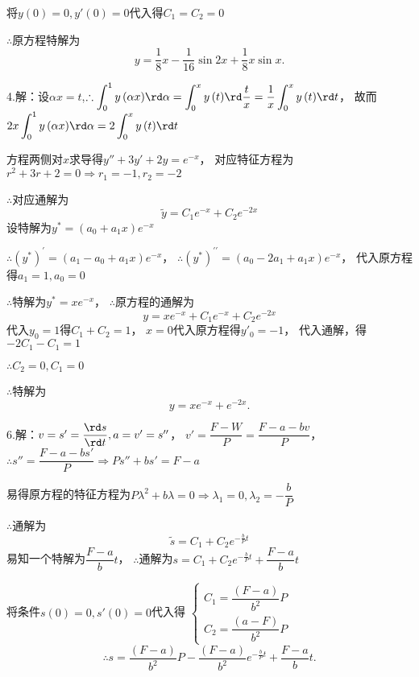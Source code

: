   将$y\left( 0 \right) = 0,y'\left( 0 \right) = 0$代入得${C_1} = {C_2} = 0$

  $\therefore $原方程特解为
  \[y = \dfrac{1}{8}x - \dfrac{1}{{16}}\sin 2x + \dfrac{1}{8}x\sin x.\]

  4.解：设$\alpha x = t$,$\therefore \displaystyle\int_0^1 {y\left( {\alpha x} \right)} \rd \alpha  = \int_0^x {y\left( t \right)}\rd \dfrac{t}{x} = \dfrac{1}{x}\int_0^x {y\left( t \right)} \rd t $，
  故而$2x\displaystyle\int_0^1 {y\left( {\alpha x} \right)} \rd \alpha  = 2\int_0^x {y\left( t \right)} \rd t$

  方程两侧对$x$求导得$y'' + 3y' + 2y = {e^{ - x}}$，
  对应特征方程为${r^2} + 3r + 2 = 0 \Rightarrow {r_1} =  - 1,{r_2} =  - 2$

  $\therefore $对应通解为\[\tilde y = {C_1}{e^{ - x}} + {C_2}{e^{ - 2x}}\]
  设特解为${y^*} = \left( {{a_0} + {a_1}x} \right){e^{ - x}}$

  $\therefore {\left( {{y^*}} \right)^\prime } = \left( {{a_1} - {a_0} + {a_1}x} \right){e^{ - x}}$，
  $\therefore {\left( {{y^*}} \right)^{\prime \prime }} = \left( {{a_0} - 2{a_1} + {a_1}x} \right){e^{ - x}}$，
  代入原方程得${a_1} = 1,{a_0} = 0$

  $\therefore $特解为${y^*} = x{e^{ - x}}$，
  $\therefore $原方程的通解为\[y = x{e^{ - x}} + {C_1}{e^{ - x}} + {C_2}{e^{ - 2x}}\]
  代入${y_0} = 1$得${C_1} + {C_2} = 1$，
  $x = 0$代入原方程得${y'_0}= - 1$，
  代入通解，得$ - 2{C_1} - {C_1} = 1$

  $\therefore {C_2} = 0 , {C_1} = 0$

  $\therefore $特解为\[y = x{e^{ - x}} + {e^{ - 2x}}.\]

  6.解：$v = s' = \dfrac{{\rd s}}{{\rd t}}, a = v' = s''$，
  $v' = \dfrac{{F - W}}{P} = \dfrac{{F - a - bv}}{P}$，
  $\therefore s'' = \dfrac{{F - a - bs'}}{P} \Rightarrow Ps'' + bs' = F - a$

  易得原方程的特征方程为$P{\lambda ^2} + b\lambda  = 0 \Rightarrow {\lambda _1} = 0,{\lambda _2} =  - \dfrac{b}{P}$

  $\therefore $通解为\[\tilde s = {C_1} + {C_2}{e^{ - \frac{b}{P}t}}\]
  易知一个特解为$\dfrac{{F - a}}{b}t$，
  $\therefore $通解为$s = {C_1} + {C_2}{e^{ - \frac{b}{P}t}} + \dfrac{{F - a}}{b}t$

  将条件$s\left( 0 \right) = 0,s'\left( 0 \right) = 0$代入得
  $\begin{cases}
    {{C_1} = \dfrac{{\left( {F - a} \right)}}{{{b^2}}}P} \\
    {{C_2} = \dfrac{{\left( {a - F} \right)}}{{{b^2}}}P}
  \end{cases}$
  \[\therefore s = \dfrac{{\left( {F - a} \right)}}{{{b^2}}}P - \dfrac{{\left( {F - a} \right)}}{{{b^2}}}{e^{ - \frac{b}{P}t}} + \dfrac{{F - a}}{b}t.\]



